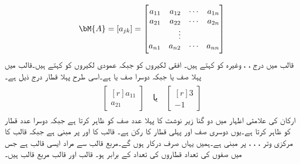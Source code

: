 \begin{align}\label{مساوات_نظام_متعدد_جمع_متعدد_قالب}
\bM{A}=[a_{jk}]=
\begin{bmatrix*}[r]
a_{11} & a_{12} &\cdots & a_{1n}\\
a_{21} & a_{22}& \cdots & a_{2n}\\
& \vdots &  &\\
a_{n1} & a_{n2}& \cdots & a_{nn}
\end{bmatrix*}
\end{align}
قالب میں درج ، ،  وغیرہ کو  کہتے ہیں۔ افقی لکیروں کو  جبکہ عمودی لکیروں کو  کہتے ہیں۔قالب  میں پہلا صف  یا  جبکہ دوسرا صف  یا  ہے۔اسی طرح پہلا قطار درج ذیل ہے۔
\begin{gather*}
\begin{aligned}
\begin{bmatrix*}[r]
a_{11}\\
a_{21}
\end{bmatrix*}\quad \text{یا}\quad 
\begin{bmatrix*}[r]
3\\
-1
\end{bmatrix*}
\end{aligned}
\end{gather*}
ارکان کی علامتی اظہار میں دو گنا زیر نوشت کا پہلا عدد صف کو ظاہر کرتا ہے جبکہ دوسرا عدد قطار کو ظاہر کرتا ہے۔یوں  دوسری صف اور پہلی قطار کا رکن ہے۔ قالب  کا   اور  پر مبنی ہے جبکہ قالب  کا مرکزی وتر ، ، ،  پر مبنی ہے۔ہمیں یہاں صرف  درکار ہوں گے۔مربع قالب سے مراد ایسی قالب ہے جس میں صفوں کی تعداد قطاروں کی تعداد کے برابر ہو۔ قالب  اور قالب  مربع قالب ہیں۔

